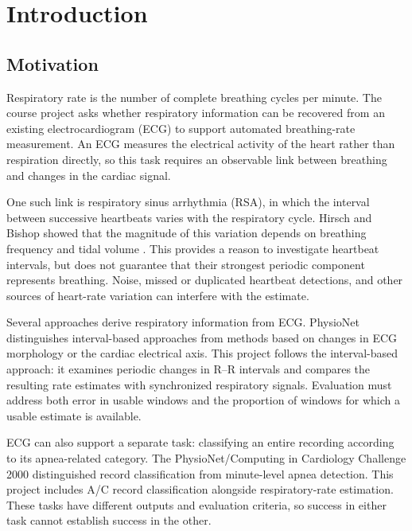 \chapter{Introduction}
\section{Motivation}
Respiratory rate is the number of complete breathing cycles per minute. The course project asks whether respiratory information can be recovered from an existing electrocardiogram (ECG) to support automated breathing-rate measurement. An ECG measures the electrical activity of the heart rather than respiration directly, so this task requires an observable link between breathing and changes in the cardiac signal.

One such link is respiratory sinus arrhythmia (RSA), in which the interval between successive heartbeats varies with the respiratory cycle. Hirsch and Bishop showed that the magnitude of this variation depends on breathing frequency and tidal volume \cite{hirsch}. This provides a reason to investigate heartbeat intervals, but does not guarantee that their strongest periodic component represents breathing. Noise, missed or duplicated heartbeat detections, and other sources of heart-rate variation can interfere with the estimate.

Several approaches derive respiratory information from ECG. PhysioNet distinguishes interval-based approaches from methods based on changes in ECG morphology or the cardiac electrical axis. This project follows the interval-based approach: it examines periodic changes in R--R intervals and compares the resulting rate estimates with synchronized respiratory signals. Evaluation must address both error in usable windows and the proportion of windows for which a usable estimate is available.

ECG can also support a separate task: classifying an entire recording according to its apnea-related category. The PhysioNet/Computing in Cardiology Challenge 2000 distinguished record classification from minute-level apnea detection. This project includes A/C record classification alongside respiratory-rate estimation. These tasks have different outputs and evaluation criteria, so success in either task cannot establish success in the other.

